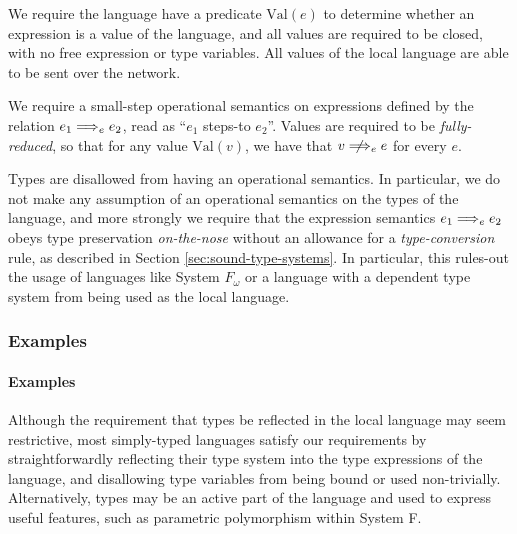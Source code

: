 We require the language have a predicate $\text{Val}(e)$ to determine whether an expression is a value of the language, and all values are required to be closed, with no free expression or type variables.
All values of the local language are able to be sent over the network.

We require a small-step operational semantics on expressions defined by the relation $e_1 \localstep e_2$, read as ``$e_1$ steps-to $e_2$''.
Values are required to be \emph{fully-reduced}, so that for any value $\text{Val}(v)$, we have that $v \nlocalstep e$ for every $e$.

Types are disallowed from having an operational semantics.
In particular, we do not make any assumption of an operational semantics on the types of the language, and more strongly we require that the expression semantics $e_1 \localstep e_2$ obeys type preservation \emph{on-the-nose} without an allowance for a \emph{type-conversion} rule, as described in Section \ref{sec:sound-type-systems}.
In particular, this rules-out the usage of languages like System $F_\omega$ or a language with a dependent type system from being used as the local language.

\iftr\subsubsection{Examples}\else\paragraph{Examples}\fi
\label{sec:loc-lang-examples}

Although the requirement that types be reflected in the local language may seem restrictive, most simply-typed languages satisfy our requirements by straightforwardly reflecting their type system into the type expressions of the language, and disallowing type variables from being bound or used non-trivially.
Alternatively, types may be an active part of the language and used to express useful features, such as parametric polymorphism within System F.


